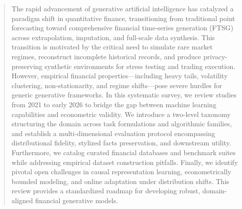 \begin{abstract}
The rapid advancement of generative artificial intelligence has catalyzed a paradigm shift in quantitative finance, transitioning from traditional point forecasting toward comprehensive financial time-series generation (FTSG) across extrapolation, imputation, and full-scale data synthesis. This transition is motivated by the critical need to simulate rare market regimes, reconstruct incomplete historical records, and produce privacy-preserving synthetic environments for stress testing and trading execution. However, empirical financial properties---including heavy tails, volatility clustering, non-stationarity, and regime shifts---pose severe hurdles for generic generative frameworks. In this systematic survey, we review studies from 2021 to early 2026 to bridge the gap between machine learning capabilities and econometric validity. We introduce a two-level taxonomy structuring the domain across task formulations and algorithmic families, and establish a multi-dimensional evaluation protocol encompassing distributional fidelity, stylized facts preservation, and downstream utility. Furthermore, we catalog curated financial databases and benchmark suites while addressing empirical dataset construction pitfalls. Finally, we identify pivotal open challenges in causal representation learning, econometrically bounded modeling, and online adaptation under distribution shifts. This review provides a standardized roadmap for developing robust, domain-aligned financial generative models.
\end{abstract}